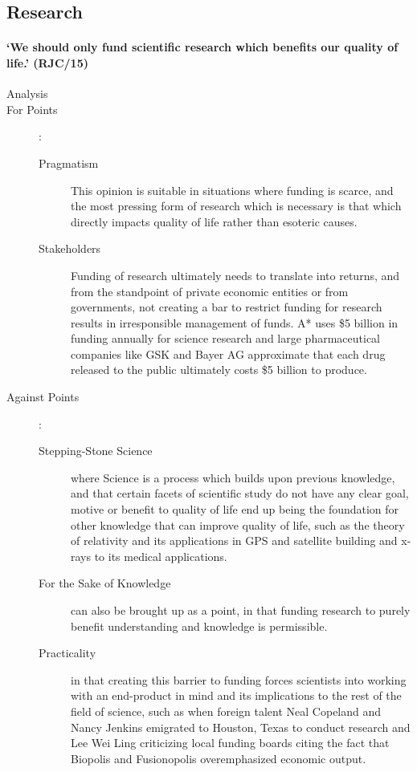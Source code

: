 \documentclass[../../main]{subfiles}
\begin{document}
\subsection{Research}

\paragraph{`We should only fund scientific research which benefits our quality of life.' (RJC/15)}

\begin{description}
	\item[Analysis]
	\item[For Points] :
		\begin{description}
			\item[Pragmatism] This opinion is suitable in situations where funding is scarce, and the most pressing form of research which is necessary is that which directly impacts quality of life rather than esoteric causes.
			\item[Stakeholders] Funding of research ultimately needs to translate into returns, and from the standpoint of private economic entities or from governments, not creating a bar to restrict funding for research results in irresponsible management of funds. A* uses \$5 billion in funding annually for science research and large pharmaceutical companies like GSK and Bayer AG approximate that each drug released to the public ultimately costs \$5 billion to produce.
		\end{description}
	\item[Against Points] :
		\begin{description}
			\item[Stepping-Stone Science] where Science is a process which builds upon previous knowledge, and that certain facets of scientific study do not have any clear goal, motive or benefit to quality of life end up being the foundation for other knowledge that can improve quality of life, such as the theory of relativity and its applications in GPS and satellite building and x-rays to its medical applications.
			\item[For the Sake of Knowledge] can also be brought up as a point, in that funding research to purely benefit understanding and knowledge is permissible.
			\item[Practicality] in that creating this barrier to funding forces scientists into working with an end-product in mind and its implications to the rest of the field of science, such as when foreign talent Neal Copeland and Nancy Jenkins emigrated to Houston, Texas to conduct research and Lee Wei Ling criticizing local funding boards citing the fact that Biopolis and Fusionopolis overemphasized economic output.
		\end{description}
\end{description}
\end{document}
